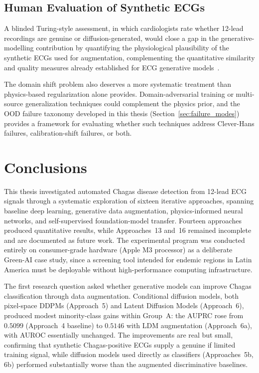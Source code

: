 \subsection{Human Evaluation of Synthetic ECGs}
\label{subsec:future_human_eval}

A blinded Turing-style assessment, in which cardiologists rate whether 12-lead recordings are genuine or diffusion-generated, would close a gap in the generative-modelling contribution by quantifying the physiological plausibility of the synthetic ECGs used for augmentation, complementing the quantitative similarity and quality measures already established for ECG generative models~\cite{alcaraz2023diffusion,neurokit2}.

The domain shift problem also deserves a more systematic treatment than physics-based regularization alone provides. Domain-adversarial training or multi-source generalization techniques could complement the physics prior, and the OOD failure taxonomy developed in this thesis (Section~\ref{sec:failure_modes}) provides a framework for evaluating whether such techniques address Clever-Hans failures, calibration-shift failures, or both.

\section{Conclusions}
\label{sec:conclusions_final}

This thesis investigated automated Chagas disease detection from 12-lead ECG signals through a systematic exploration of sixteen iterative approaches, spanning baseline deep learning, generative data augmentation, physics-informed neural networks, and self-supervised foundation-model transfer. Fourteen approaches produced quantitative results, while Approaches~13 and~16 remained incomplete and are documented as future work. The experimental program was conducted entirely on consumer-grade hardware (Apple M3 processor) as a deliberate Green-AI case study, since a screening tool intended for endemic regions in Latin America must be deployable without high-performance computing infrastructure.

The first research question asked whether generative models can improve Chagas classification through data augmentation. Conditional diffusion models, both pixel-space DDPMs (Approach~5) and Latent Diffusion Models (Approach~6), produced modest minority-class gains within Group~A: the AUPRC rose from $0.5099$ (Approach~4 baseline) to $0.5146$ with LDM augmentation (Approach~6a), with AUROC essentially unchanged. The improvements are real but small, confirming that synthetic Chagas-positive ECGs supply a genuine if limited training signal, while diffusion models used directly as classifiers (Approaches~5b, 6b) performed substantially worse than the augmented discriminative baselines.

